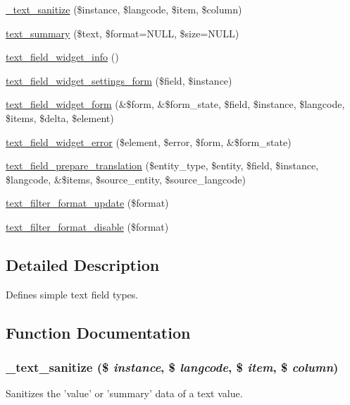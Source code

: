 \begin{DoxyCompactItemize}
\item 
\hyperlink{text_8module_a4fc0ca3bd718171be9d5cfded5bc8831}{\_\-text\_\-sanitize} (\$instance, \$langcode, \$item, \$column)
\item 
\hyperlink{text_8module_a5ae589015a2710f032b1407af469a4c1}{text\_\-summary} (\$text, \$format=NULL, \$size=NULL)
\item 
\hyperlink{text_8module_aacf1cec61c2dbad31fb5ab8a1ee98085}{text\_\-field\_\-widget\_\-info} ()
\item 
\hyperlink{text_8module_a147e56b0fdbe7e08da652c5ae64c8a0f}{text\_\-field\_\-widget\_\-settings\_\-form} (\$field, \$instance)
\item 
\hyperlink{text_8module_a4eb0394997c0e7511c717b9c6fd7590e}{text\_\-field\_\-widget\_\-form} (\&\$form, \&\$form\_\-state, \$field, \$instance, \$langcode, \$items, \$delta, \$element)
\item 
\hyperlink{text_8module_a6ca0cbd6b13e1893a1655fcb404e6b76}{text\_\-field\_\-widget\_\-error} (\$element, \$error, \$form, \&\$form\_\-state)
\item 
\hyperlink{text_8module_a05f6cb8a18f03ffc50d78563c2e7cba6}{text\_\-field\_\-prepare\_\-translation} (\$entity\_\-type, \$entity, \$field, \$instance, \$langcode, \&\$items, \$source\_\-entity, \$source\_\-langcode)
\item 
\hyperlink{text_8module_a8b955b60415b2f9473046fb92c1c9157}{text\_\-filter\_\-format\_\-update} (\$format)
\item 
\hyperlink{text_8module_a69f8b21fdab6c273c1b3825de83eb2de}{text\_\-filter\_\-format\_\-disable} (\$format)
\end{DoxyCompactItemize}


\subsection{Detailed Description}
Defines simple text field types. 

\subsection{Function Documentation}
\hypertarget{text_8module_a4fc0ca3bd718171be9d5cfded5bc8831}{
\subsubsection[{\_\-text\_\-sanitize}]{\setlength{\rightskip}{0pt plus 5cm}\_\-text\_\-sanitize (\$ {\em instance}, \/  \$ {\em langcode}, \/  \$ {\em item}, \/  \$ {\em column})}}
\label{text_8module_a4fc0ca3bd718171be9d5cfded5bc8831}
Sanitizes the 'value' or 'summary' data of a text value.

